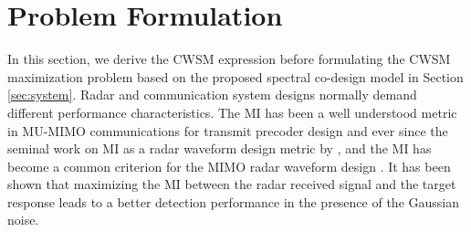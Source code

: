 \documentclass[9pt,journal]{IEEEtran}
\begin{document}
\section{Problem Formulation}
\label{sec: formulation}
In this section, we derive the CWSM expression before formulating the CWSM maximization problem based on the proposed spectral co-design model in Section \ref{sec:system}. Radar and communication system designs normally demand different performance characteristics. The MI has been a well understood metric in MU-MIMO communications for transmit precoder design\cite{WMMSEWSR} and ever since the seminal work on MI as a radar waveform design metric by \cite{Bellinformation}, and the MI has become a common criterion for the MIMO radar waveform design \cite{Jammer_game,NaghshTSP2017}. It has been shown that maximizing the MI between the radar received signal and the target response leads to a better detection performance in the presence of the Gaussian noise\cite{Jammer_game}. 
	
\end{document}
